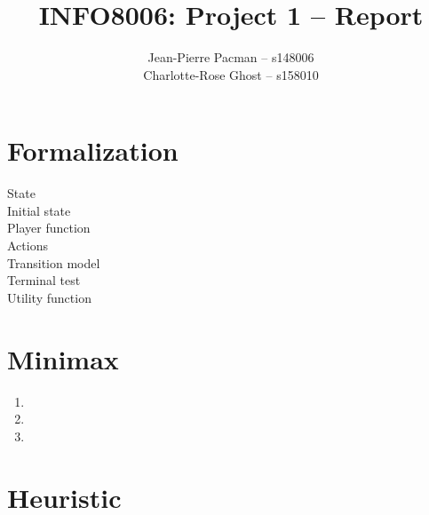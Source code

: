 \documentclass{article}
\title{\Large{INFO8006: Project 1 -- Report}}
\author{Jean-Pierre Pacman -- s148006\\Charlotte-Rose Ghost -- s158010}
\begin{document}
\maketitle

\section{Formalization}

\begin{description}
    \item[State]
    \item[Initial state]
    \item[Player function]
    \item[Actions]
    \item[Transition model]
    \item[Terminal test]
    \item[Utility function]
\end{description}

\section{Minimax}

\begin{enumerate}[leftmargin=*, label=\alph*.]
    \item
    \item
    \item
\end{enumerate}

\section{Heuristic}
\end{document}
